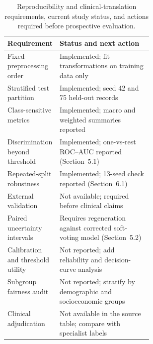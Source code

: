\documentclass{elektr}
\begin{document}
\begin{table}[H]
\centering
\caption{Reproducibility and clinical-translation requirements, current study status, and actions required before prospective evaluation.}
\label{tab:checklist}
\footnotesize
\renewcommand{\arraystretch}{1.12}
\begin{tabularx}{\linewidth}{@{}p{0.34\linewidth}X@{}}
\toprule
Requirement & Status and next action \\
\midrule
Fixed preprocessing order & Implemented; fit transformations on training data only \\
Stratified test partition & Implemented; seed 42 and 75 held-out records \\
Class-sensitive metrics & Implemented; macro and weighted summaries reported \\
Discrimination beyond threshold & Implemented; one-vs-rest ROC--AUC reported (Section~5.1) \\
Repeated-split robustness & Implemented; 13-seed check reported (Section~6.1) \\
External validation & Not available; required before clinical claims \\
Paired uncertainty intervals & Requires regeneration against corrected soft-voting model (Section~5.2) \\
Calibration and threshold utility & Not reported; add reliability and decision-curve analysis \\
Subgroup fairness audit & Not reported; stratify by demographic and socioeconomic groups \\
Clinical adjudication & Not available in the source table; compare with specialist labels \\
\bottomrule
\end{tabularx}
\end{table}
\end{document}
